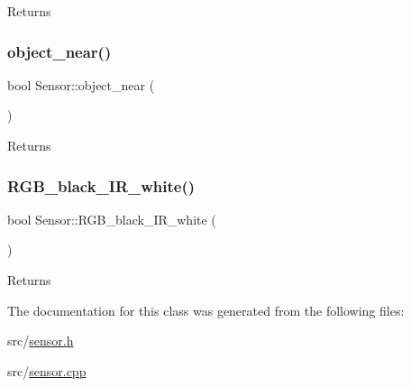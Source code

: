 \begin{DoxyReturn}{Returns}

\end{DoxyReturn}
\mbox{\label{class_sensor_a4f797e3f6a549cfdefab639eb6a86787}} 
\subsubsection{\texorpdfstring{object\+\_\+near()}{object\_near()}}
{\footnotesize\ttfamily bool Sensor\+::object\+\_\+near (\begin{DoxyParamCaption}{ }\end{DoxyParamCaption})}

\begin{DoxyReturn}{Returns}

\end{DoxyReturn}
\mbox{\label{class_sensor_aa75ec0ed5bd2782f726f7e01796b2285}} 
\subsubsection{\texorpdfstring{R\+G\+B\+\_\+black\+\_\+\+I\+R\+\_\+white()}{RGB\_black\_IR\_white()}}
{\footnotesize\ttfamily bool Sensor\+::\+R\+G\+B\+\_\+black\+\_\+\+I\+R\+\_\+white (\begin{DoxyParamCaption}{ }\end{DoxyParamCaption})}

\begin{DoxyReturn}{Returns}

\end{DoxyReturn}


The documentation for this class was generated from the following files\+:\begin{DoxyCompactItemize}
\item 
src/\mbox{\hyperlink{sensor_8h}{sensor.\+h}}\item 
src/\mbox{\hyperlink{sensor_8cpp}{sensor.\+cpp}}\end{DoxyCompactItemize}
